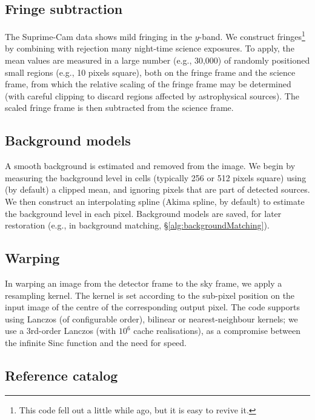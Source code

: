 \documentclass[12pt]{article}
\begin{document}
{\subsection{Fringe subtraction}
\label{alg:fringe}

The Suprime-Cam data shows mild fringing in the $y$-band.  We construct fringes\footnote{This code fell out a
  little while ago, but it is easy to revive it.} by combining with rejection many night-time science
exposures.  To apply, the mean values are measured in a large number (e.g., 30,000) of randomly positioned
small regions (e.g., 10 pixels square), both on the fringe frame and the science frame, from which the relative
scaling of the fringe frame may be determined (with careful clipping to discard regions affected by
astrophysical sources).  The scaled fringe frame is then subtracted from the science frame.

\subsection{Background models}
\label{alg:background}

A smooth background is estimated and removed from the image.  We begin by measuring the background level in
cells (typically 256 or 512 pixels square) using (by default) a clipped mean, and ignoring pixels that are
part of detected sources.  We then construct an interpolating spline (Akima spline, by default) to estimate
the background level in each pixel.  Background models are saved, for later restoration (e.g., in background
matching, \S\ref{alg:backgroundMatching}).

\subsection{Warping}
\label{alg:warp}

In warping an image from the detector frame to the sky frame, we apply a resampling kernel.  The kernel is set
according to the sub-pixel position on the input image of the centre of the corresponding output pixel.  The
code supports using Lanczos (of configurable order), bilinear or nearest-neighbour kernels; we use a 3rd-order
Lanczos (with $10^6$ cache realisations), as a compromise between the infinite Sinc function and the need for
speed.

\subsection{Reference catalog}

}
\end{document}
